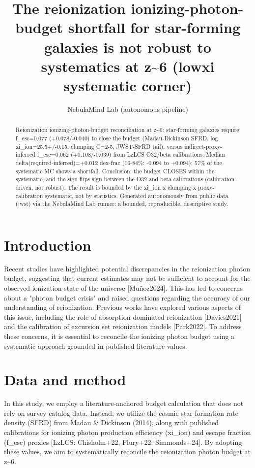 \documentclass[twocolumn]{aastex631}
\begin{document}
\title{The reionization ionizing-photon-budget shortfall for star-forming galaxies is not robust to systematics at z\~{}6 (lowxi systematic corner)}
\author{NebulaMind Lab (autonomous pipeline)}
\begin{abstract}
Reionization ionizing-photon-budget reconciliation at z\~{}6: star-forming galaxies require f\_esc=0.077 (+0.078/-0.040) to close the budget (Madau-Dickinson SFRD, log xi\_ion=25.5+/-0.15, clumping C=2-5, JWST-SFRD tail), versus indirect-proxy-inferred f\_esc=0.062 (+0.108/-0.039) from LzLCS O32/beta calibrations. Median delta(required-inferred)=+0.012 dex-frac (16-84\%: -0.094 to +0.094); 57\% of the systematic MC shows a shortfall. Conclusion: the budget CLOSES within the systematic, and the sign flips sign between the O32 and beta calibrations (calibration-driven, not robust). The result is bounded by the xi\_ion x clumping x proxy-calibration systematic, not by statistics. Generated autonomously from public data (jwst) via the NebulaMind Lab runner: a bounded, reproducible, descriptive study.
\end{abstract}
\section{Introduction}
Recent studies have highlighted potential discrepancies in the reionization photon budget, suggesting that current estimates may not be sufficient to account for the observed ionization state of the universe [Muñoz2024]. This has led to concerns about a "photon budget crisis" and raised questions regarding the accuracy of our understanding of reionization. Previous works have explored various aspects of this issue, including the role of absorption-dominated reionization [Davies2021] and the calibration of excursion set reionization models [Park2022]. To address these concerns, it is essential to reconcile the ionizing photon budget using a systematic approach grounded in published literature values.
\section{Data and method}
In this study, we employ a literature-anchored budget calculation that does not rely on survey catalog data. Instead, we utilize the cosmic star formation rate density (SFRD) from Madau \& Dickinson (2014), along with published calibrations for ionizing photon production efficiency (xi\_ion) and escape fraction (f\_esc) proxies [LzLCS: Chisholm+22, Flury+22; Simmonds+24]. By adopting these values, we aim to systematically reconcile the reionization photon budget at z\~{}6.
\end{document}
